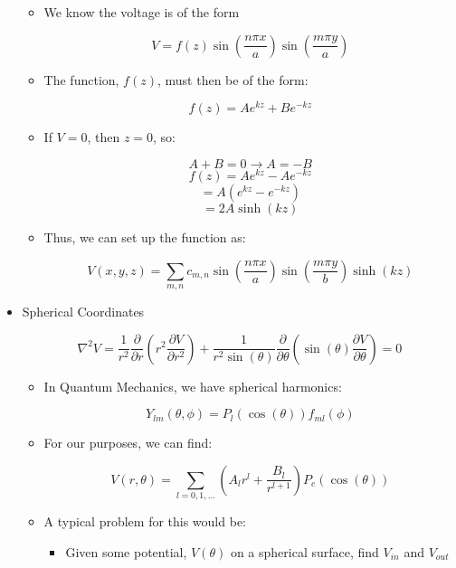 \begin{itemize}
\begin{itemize}
        \item We know the voltage is of the form

          $$V=f(z)\sin\left( \frac{n\pi x}{a} \right)\sin\left( \frac{m\pi y}{a} \right)$$

        \item The function, $f(z)$, must then be of the form:

          $$f(z)=Ae^{kz}+Be^{-kz}$$

        \item If $V=0$, then $z=0$, so:

          $$A+B=0\rightarrow A=-B$$
          $$f(z)=Ae^{kz}-Ae^{-kz}$$
          $$=A(e^{kz}-e^{-kz})$$
          $$=2A\sinh(kz)$$

        \item Thus, we can set up the function as:

          $$V(x,y,z)=\sum_{m,n} c_{m,n}\sin\left( \frac{n\pi x}{a} \right)\sin\left( \frac{m\pi y}{b} \right)\sinh(kz)$$

      \end{itemize}

    \item Spherical Coordinates

      $$\nabla^2V=\frac{1}{r^2}\frac{\partial}{\partial r}\left( r^2\frac{\partial V}{\partial r^2} \right)+\frac{1}{r^2\sin(\theta)}\frac{\partial}{\partial \theta}\left( \sin(\theta)\frac{\partial V}{\partial \theta} \right)=0$$

      \begin{itemize}

        \item In Quantum Mechanics, we have spherical harmonics:

          $$Y_{lm}(\theta,\phi)=P_l(\cos(\theta))f_{ml}(\phi)$$

        \item For our purposes, we can find:

          $$V(r,\theta)=\sum_{l=0,1,\ldots}\left( A_lr^l+\frac{B_l}{r^{l+1}} \right)P_e(\cos(\theta))$$

        \item A typical problem for this would be:

          \begin{itemize}

            \item Given some potential, $V(\theta)$ on a spherical surface, find $V_{in}$ and $V_{out}$


\end{itemize}
\end{itemize}
\end{itemize}
